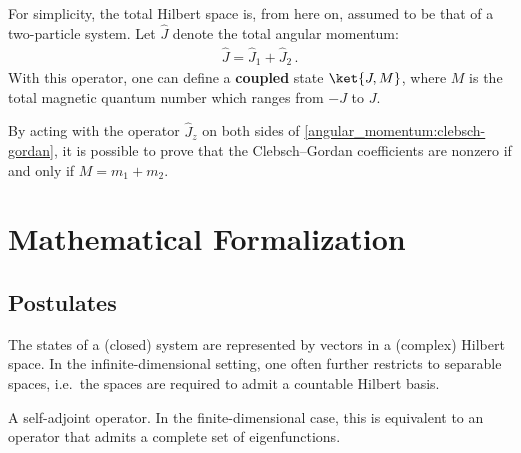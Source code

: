     For simplicity, the total Hilbert space is, from here on, assumed to be that of a two-particle system. Let $\widehat{J}$ denote the total angular momentum:
    \begin{gather}
        \widehat{J} = \widehat{J}_1 + \widehat{J}_2\,.
    \end{gather}
    With this operator, one can define a \textbf{coupled} state $\ket{J,M}$, where $M$ is the total magnetic quantum number which ranges from $-J$ to $J$.


    \begin{property}
        By acting with the operator $\widehat{J}_z$ on both sides of \cref{angular_momentum:clebsch-gordan}, it is possible to prove that the Clebsch--Gordan coefficients are nonzero if and only if $M = m_1 + m_2$.
    \end{property}

\section{Mathematical Formalization}\label{section:mathematical_formalism_qm}
\subsection{Postulates}

    \begin{axiom}
        The states of a (closed) system are represented by vectors in a (complex) Hilbert space. In the infinite-dimensional setting, one often further restricts to separable spaces, i.e.~the spaces are required to admit a countable Hilbert basis.
    \end{axiom}

    \begin{axiom}[Observables]
        A self-adjoint operator. In the finite-dimensional case, this is equivalent to an operator that admits a complete set of eigenfunctions.
    \end{axiom}

